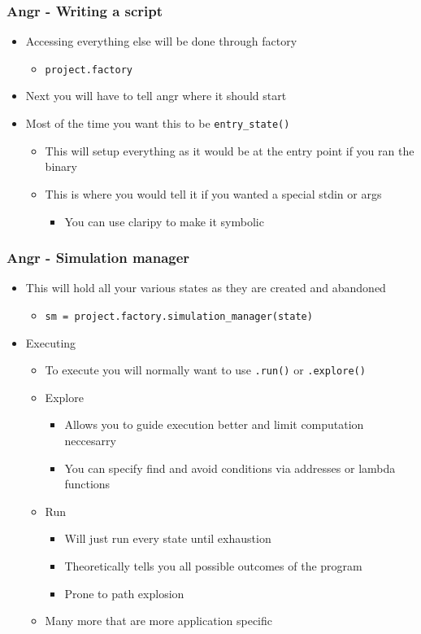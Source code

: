 \documentclass[aspectratio=169]{beamer}
\begin{document}
\begin{frame}[fragile]
\frametitle{Angr - Writing a script}
\begin{itemize}
\item Accessing everything else will be done through factory
\begin{itemize}
\item \verb|project.factory|
\end{itemize}
\item Next you will have to tell angr where it should start
\item Most of the time you want this to be \verb|entry_state()|
\begin{itemize}
\item This will setup everything as it would be at the entry point if you ran the binary
\item This is where you would tell it if you wanted a special stdin or args
\begin{itemize}
\item You can use claripy to make it symbolic
\end{itemize}
\end{itemize}
\end{itemize}
\end{frame}

\begin{frame}[fragile]
\frametitle{Angr - Simulation manager}
\begin{itemize}
\item This will hold all your various states as they are created and abandoned
\begin{itemize}
\item \verb|sm = project.factory.simulation_manager(state)|
\end{itemize}
\item Executing
\begin{itemize}
\item To execute you will normally want to use \verb|.run()| or \verb|.explore()|
\item Explore
\begin{itemize}
\item Allows you to guide execution better and limit computation neccesarry
\item You can specify find and avoid conditions via addresses or lambda functions
\end{itemize}
\item Run
\begin{itemize}
\item Will just run every state until exhaustion
\item Theoretically tells you all possible outcomes of the program
\item Prone to path explosion
\end{itemize}
\item Many more that are more application specific
\end{itemize}
\end{itemize}
\end{frame}
\end{document}
